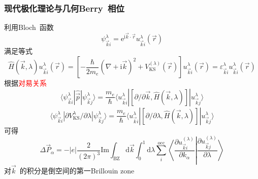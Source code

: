 \documentclass[cjk,slidestop,compress,mathserif,blue]{beamer}
\begin{document}
\frame
{
	\frametitle{现代极化理论与几何\textrm{Berry~}相位}
	利用\textrm{Bloch~}函数
	\begin{displaymath}
		\psi_{\vec k i}^{\lambda}=\mathrm{e}^{\mathrm{i}\vec k\cdot\vec r}u_{\vec k i}^{\lambda}(\vec r)
	\end{displaymath}
	满足等式
	\begin{displaymath}
		\hat H(\vec k,\lambda)u_{\vec k i}^{\lambda}(\vec r)=\left[ -\frac{\hbar}{2m_e}(\nabla+\mathrm{i}\vec k)^2 +V_{\mathrm{KS}}^{(\lambda)}(\vec r)\right]u_{\vec k i}^{\lambda}(\vec r)=\varepsilon_{\vec k i}^{\lambda}u_{\vec k i}^{\lambda}(\vec r)
	\end{displaymath}
	根据\textcolor{red}{对易关系}
	\begin{displaymath}
		\langle\psi_{\vec k i}^{\lambda}|\hat{\vec p}|\psi_{\vec k j}^{\lambda}\rangle=\frac{m_e}{\hbar}\langle u_{\vec k i}^{\lambda}|[\partial/\partial\vec k,\hat H(\vec k,\lambda)]|u_{\vec k j}^{\lambda}\rangle
	\end{displaymath}
	\begin{displaymath}
		\langle\psi_{\vec k i}^{\lambda}|\partial V_{\mathrm{KS}}^{\lambda}/\partial\lambda|\psi_{\vec k j}^{\lambda}\rangle=\frac{m_e}{\hbar}\langle u_{\vec k i}^{\lambda}|[\partial/\partial\lambda,\hat H(\vec k,\lambda)]|u_{\vec k j}^{\lambda}\rangle
	\end{displaymath}
	可得
	\begin{displaymath}
		\Delta\vec P_{\alpha}=-|e|\frac2{(2\pi)^3}\mathrm{Im}\int_{\mathrm{BZ}}\mathrm{d}\vec k\int_0^1\mathrm{d}\lambda\sum_i^{\mathrm{occ}}\left\langle\frac{\partial u_{\vec k i}^{(\lambda)}}{\partial k_{\alpha}}\right|\left.\frac{\partial u_{\vec k j}^{(\lambda)}}{\partial\lambda}\right\rangle
	\end{displaymath}
	对$\vec k$~的积分是倒空间的第一\textrm{Brillouin zone}
}
\end{document}

